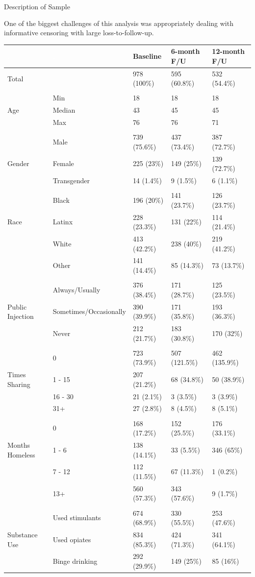 \documentclass[ignorenonframetext,]{beamer}
\begin{document}
\begin{frame}{Description of Sample}

One of the biggest challenges of this analysis was appropriately dealing
with informative censoring with large loss-to-follow-up.

\fontsize{5}{5}\selectfont

\begin{longtable}[]{@{}lllll@{}}
\toprule
\textcolor{white}{.} & \textcolor{white}{.} & Baseline & 6-month F/U &
12-month F/U\tabularnewline
\midrule
\endhead
Total & & 978 (100\%) & 595 (60.8\%) & 532 (54.4\%)\tabularnewline
& & & &\tabularnewline
& Min & 18 & 18 & 18\tabularnewline
Age & Median & 43 & 45 & 45\tabularnewline
& Max & 76 & 76 & 71\tabularnewline
& & & &\tabularnewline
& Male & 739 (75.6\%) & 437 (73.4\%) & 387 (72.7\%)\tabularnewline
Gender & Female & 225 (23\%) & 149 (25\%) & 139 (72.7\%)\tabularnewline
& Transgender & 14 (1.4\%) & 9 (1.5\%) & 6 (1.1\%)\tabularnewline
& & & &\tabularnewline
& Black & 196 (20\%) & 141 (23.7\%) & 126 (23.7\%)\tabularnewline
Race & Latinx & 228 (23.3\%) & 131 (22\%) & 114 (21.4\%)\tabularnewline
& White & 413 (42.2\%) & 238 (40\%) & 219 (41.2\%)\tabularnewline
& Other & 141 (14.4\%) & 85 (14.3\%) & 73 (13.7\%)\tabularnewline
& & & &\tabularnewline
& Always/Usually & 376 (38.4\%) & 171 (28.7\%) & 125
(23.5\%)\tabularnewline
Public Injection & Sometimes/Occasionally & 390 (39.9\%) & 171 (35.8\%)
& 193 (36.3\%)\tabularnewline
& Never & 212 (21.7\%) & 183 (30.8\%) & 170 (32\%)\tabularnewline
& & & &\tabularnewline
& 0 & 723 (73.9\%) & 507 (121.5\%) & 462 (135.9\%)\tabularnewline
Times Sharing & 1 - 15 & 207 (21.2\%) & 68 (34.8\%) & 50
(38.9\%)\tabularnewline
& 16 - 30 & 21 (2.1\%) & 3 (3.5\%) & 3 (3.9\%)\tabularnewline
& 31+ & 27 (2.8\%) & 8 (4.5\%) & 8 (5.1\%)\tabularnewline
& & & &\tabularnewline
& 0 & 168 (17.2\%) & 152 (25.5\%) & 176 (33.1\%)\tabularnewline
Months Homeless & 1 - 6 & 138 (14.1\%) & 33 (5.5\%) & 346
(65\%)\tabularnewline
& 7 - 12 & 112 (11.5\%) & 67 (11.3\%) & 1 (0.2\%)\tabularnewline
& 13+ & 560 (57.3\%) & 343 (57.6\%) & 9 (1.7\%)\tabularnewline
& & & &\tabularnewline
& Used stimulants & 674 (68.9\%) & 330 (55.5\%) & 253
(47.6\%)\tabularnewline
Substance Use & Used opiates & 834 (85.3\%) & 424 (71.3\%) & 341
(64.1\%)\tabularnewline
& Binge drinking & 292 (29.9\%) & 149 (25\%) & 85 (16\%)\tabularnewline
\bottomrule
\end{longtable}

\normalsize

\end{frame}
\end{document}
